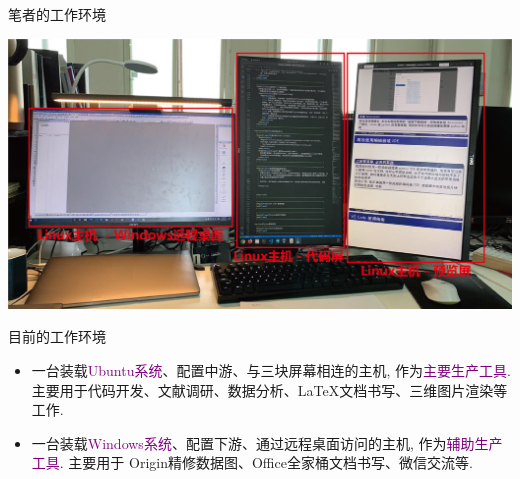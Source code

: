 \documentclass{beamer}
\newcommand{\purple}{\textcolor{purple}}
\begin{document}
    \begin{frame}{笔者的工作环境}
      \begin{center}
        \begin{tcolorbox}[beamer,width=0.8\textwidth,arc=0pt,boxsep=0pt,left=0pt,right=0pt,top=0pt,bottom=0pt]
          \includegraphics[width=\textwidth]{figure/env.png}
        \end{tcolorbox}
      \end{center}
      \begin{block}{\scriptsize 目前的工作环境}\scriptsize
        \begin{itemize}
          \item 一台装载\purple{Ubuntu系统}、配置中游、与三块屏幕相连的主机, 作为\purple{主要生产工具}. 主要用于代码开发、文献调研、数据分析、\LaTeX 文档书写、三维图片渲染等工作.
          \item 一台装载\purple{Windows系统}、配置下游、通过远程桌面访问的主机, 作为\purple{辅助生产工具}. 主要用于 Origin精修数据图、Office全家桶文档书写、微信交流等.
        \end{itemize}
      \end{block}
    \end{frame}
\end{document}
